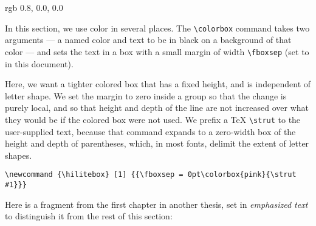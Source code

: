 


\definecolor{utahred} {rgb} {0.8, 0.0, 0.0} %

\doublespace


In this section, we use color in several places.
The \verb=\colorbox= command takes two arguments
--- a named color and text to be in black on a
background of that color --- and sets the text in
a box with a small margin of width \verb=\fboxsep=
(set to \texttt{\the\fboxsep} in this document).

Here, we want a tighter colored box that has a
fixed height, and is independent of letter shape.
We set the margin to zero inside a group so that
the change is purely local, and so that height and
depth of the line are not increased over what they
would be if the colored box were not used.  We
prefix a \TeX{} \verb=\strut= to the user-supplied
text, because that command expands to a zero-width
box of the height and depth of parentheses, which,
in most fonts, delimit the extent of letter
shapes.

\begin{verbatim}
\newcommand {\hilitebox} [1] {{\fboxsep = 0pt\colorbox{pink}{\strut #1}}}
\end{verbatim}

\newcommand {\hilitebox} [1] {{\fboxsep = 0pt\colorbox{pink}{\strut #1}}}

Here is a fragment from the first chapter in another
thesis, set in \emph{emphasized text} to distinguish it
from the rest of this section:

